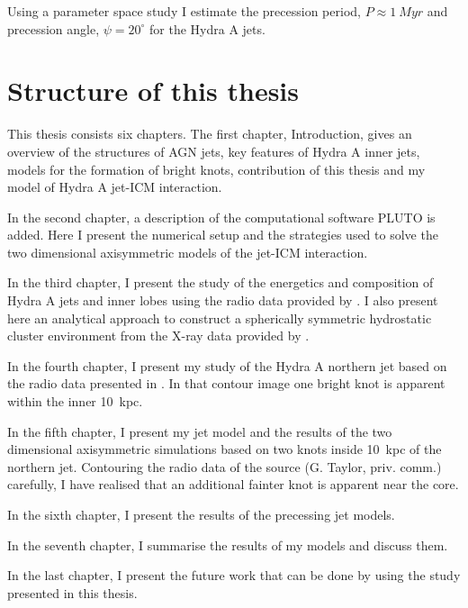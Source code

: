 Using a parameter space study I estimate the precession period, $P\approx 1~Myr$ and precession angle, $\psi = 20^{\circ}$ for the Hydra A jets. 

\section{Structure of this thesis}
This thesis consists six chapters. The first chapter, Introduction, gives an overview of the structures of AGN jets, key features of Hydra A inner jets, models for the formation of bright knots, contribution of this thesis and my model of Hydra A jet-ICM interaction.

In the second chapter, a description of the computational software PLUTO is added. Here I present the numerical setup and the strategies used to solve the two dimensional axisymmetric models of the jet-ICM interaction.

In the third chapter, I present the study of the energetics and composition of Hydra A jets and inner lobes using the radio data provided by \citet{taylor90}. I also present here an analytical approach to construct a spherically symmetric hydrostatic cluster environment from the X-ray data provided by \citet{david01}. 

In the fourth chapter, I present my study of the Hydra A northern jet based on the radio data presented in \citet{taylor90}. In that contour image one bright knot is apparent within the inner 10~kpc.  

In the fifth chapter, I present my jet model and the results of the two dimensional axisymmetric simulations based on two knots inside 10~kpc of the northern jet. Contouring the radio data of the source (G. Taylor, priv. comm.) carefully, I have realised that an additional fainter knot is apparent near the core. 

In the sixth chapter, I present the results of the precessing jet models. 

In the seventh chapter, I summarise the results of my models and discuss them. 

In the last chapter, I present the future work that can be done by using the study presented in this thesis. 



  

%

